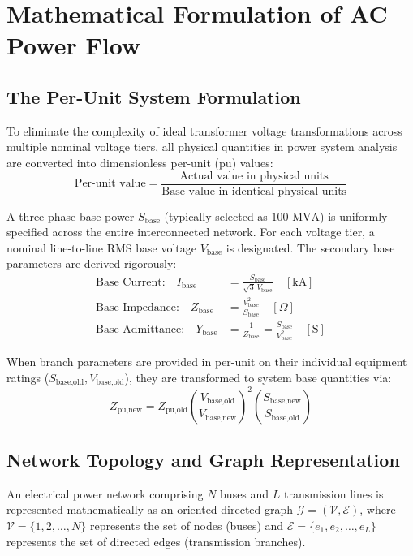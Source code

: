 \documentclass[12pt,a4paper,oneside]{report}
\begin{document}
\chapter{Mathematical Formulation of AC Power Flow}

\section{The Per-Unit System Formulation}
To eliminate the complexity of ideal transformer voltage transformations across multiple nominal voltage tiers, all physical quantities in power system analysis are converted into dimensionless per-unit (pu) values:
\begin{equation}
\text{Per-unit value} = \frac{\text{Actual value in physical units}}{\text{Base value in identical physical units}}
\end{equation}

A three-phase base power $S_{\text{base}}$ (typically selected as $100\text{ MVA}$) is uniformly specified across the entire interconnected network. For each voltage tier, a nominal line-to-line RMS base voltage $V_{\text{base}}$ is designated. The secondary base parameters are derived rigorously:
\begin{align}
\text{Base Current:}\quad I_{\text{base}} &= \frac{S_{\text{base}}}{\sqrt{3} \, V_{\text{base}}} \quad [\text{kA}] \\
\text{Base Impedance:}\quad Z_{\text{base}} &= \frac{V_{\text{base}}^2}{S_{\text{base}}} \quad [\Omega] \\
\text{Base Admittance:}\quad Y_{\text{base}} &= \frac{1}{Z_{\text{base}}} = \frac{S_{\text{base}}}{V_{\text{base}}^2} \quad [\text{S}]
\end{align}

When branch parameters are provided in per-unit on their individual equipment ratings ($S_{\text{base,old}}, V_{\text{base,old}}$), they are transformed to system base quantities via:
\begin{equation}
Z_{\text{pu,new}} = Z_{\text{pu,old}} \left( \frac{V_{\text{base,old}}}{V_{\text{base,new}}} \right)^2 \left( \frac{S_{\text{base,new}}}{S_{\text{base,old}}} \right)
\end{equation}

\section{Network Topology and Graph Representation}
An electrical power network comprising $N$ buses and $L$ transmission lines is represented mathematically as an oriented directed graph $\mathcal{G} = (\mathcal{V}, \mathcal{E})$, where $\mathcal{V} = \{1, 2, \dots, N\}$ represents the set of nodes (buses) and $\mathcal{E} = \{e_1, e_2, \dots, e_L\}$ represents the set of directed edges (transmission branches).
\end{document}

